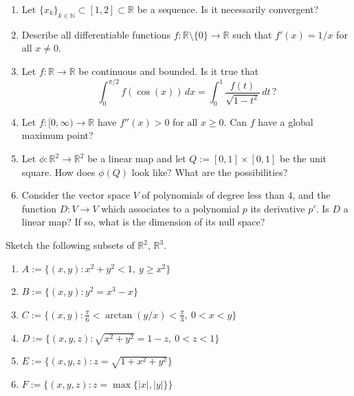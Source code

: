 \begin{exercise}
\label{ex:1.1}
\begin{enumerate}[label=\textbf{\arabic*.}]
  \item Let $\{x_k\}_{k \in \mathbb{N}} \subset [1,2] \subset \mathbb{R}$ be a sequence. Is it
    necessarily convergent?
  \item Describe all differentiable functions $f : \mathbb{R} \setminus \{0\} \to \mathbb{R}$ such
    that $f'(x) = 1/x$ for all $x \neq 0$.
  \item Let $f : \mathbb{R} \to \mathbb{R}$ be continuous and bounded. Is it true that
    \[
      \int_0^{\pi/2} f(\cos(x))\,dx = \int_0^1 \frac{f(t)}{\sqrt{1-t^2}}\,dt \, ?
    \]
  \item Let $f : [0,\infty) \to \mathbb{R}$ have $f''(x) > 0$ for all $x \geq 0$. Can $f$ have a
    global maximum point?
  \item Let $\phi : \mathbb{R}^2 \to \mathbb{R}^2$ be a linear map and let
    $Q := [0,1] \times [0,1]$ be the unit square. How does $\phi(Q)$ look like? What are the
    possibilities?
  \item Consider the vector space $V$ of polynomials of degree less than $4$, and the function
    $D : V \to V$ which associates to a polynomial $p$ its derivative $p'$. Is $D$ a linear map?
    If so, what is the dimension of its null space?
\end{enumerate}
\end{exercise}

\begin{exercise}
\label{ex:1.2}
Sketch the following subsets of $\mathbb{R}^2$, $\mathbb{R}^3$.
\begin{enumerate}[label=\textbf{\arabic*.}]
  \item $A := \{(x,y) : x^2+y^2 < 1,\ y \geq x^2\}$
  \item $B := \{(x,y) : y^2 = x^3 - x\}$
  \item $C := \{(x,y) : \tfrac{\pi}{6} < \arctan(y/x) < \tfrac{\pi}{3},\ 0 < x < y\}$
  \item $D := \{(x,y,z) : \sqrt{x^2+y^2} = 1-z,\ 0 < z < 1\}$
  \item $E := \{(x,y,z) : z = \sqrt{1+x^2+y^2}\}$
  \item $F := \{(x,y,z) : z = \max\{|x|,|y|\}\}$
\end{enumerate}
\end{exercise}

